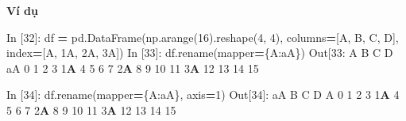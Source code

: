 \documentclass[
]{book}
\newenvironment{Shaded}{\begin{snugshade}}{\end{snugshade}}
\newcommand{\DecValTok}[1]{\textcolor[rgb]{0.00,0.00,0.81}{#1}}
\newcommand{\ErrorTok}[1]{\textcolor[rgb]{0.64,0.00,0.00}{\textbf{#1}}}
\newcommand{\NormalTok}[1]{#1}
\newcommand{\OperatorTok}[1]{\textcolor[rgb]{0.81,0.36,0.00}{\textbf{#1}}}
\newcommand{\StringTok}[1]{\textcolor[rgb]{0.31,0.60,0.02}{#1}}
\begin{document}
\textbf{Ví dụ}

\begin{Shaded}
\begin{Highlighting}[]
\NormalTok{In [}\DecValTok{32}\NormalTok{]: df }\OperatorTok{=}\NormalTok{ pd.DataFrame(np.arange(}\DecValTok{16}\NormalTok{).reshape(}\DecValTok{4}\NormalTok{, }\DecValTok{4}\NormalTok{),}
\NormalTok{                        columns}\OperatorTok{=}\NormalTok{[}\StringTok{\textquotesingle{}A\textquotesingle{}}\NormalTok{, }\StringTok{\textquotesingle{}B\textquotesingle{}}\NormalTok{, }\StringTok{\textquotesingle{}C\textquotesingle{}}\NormalTok{, }\StringTok{\textquotesingle{}D\textquotesingle{}}\NormalTok{],}
\NormalTok{                        index}\OperatorTok{=}\NormalTok{[}\StringTok{\textquotesingle{}A\textquotesingle{}}\NormalTok{, }\StringTok{\textquotesingle{}1A\textquotesingle{}}\NormalTok{, }\StringTok{\textquotesingle{}2A\textquotesingle{}}\NormalTok{, }\StringTok{\textquotesingle{}3A\textquotesingle{}}\NormalTok{])}
\NormalTok{In [}\DecValTok{33}\NormalTok{]: df.rename(mapper}\OperatorTok{=}\NormalTok{\{}\StringTok{\textquotesingle{}A\textquotesingle{}}\NormalTok{:}\StringTok{\textquotesingle{}aA\textquotesingle{}}\NormalTok{\})}
\NormalTok{Out[}\DecValTok{33}\NormalTok{: }
\NormalTok{     A   B   C   D}
\NormalTok{aA   }\DecValTok{0}   \DecValTok{1}   \DecValTok{2}   \DecValTok{3}
\DecValTok{1}\ErrorTok{A}   \DecValTok{4}   \DecValTok{5}   \DecValTok{6}   \DecValTok{7}
\DecValTok{2}\ErrorTok{A}   \DecValTok{8}   \DecValTok{9}  \DecValTok{10}  \DecValTok{11}
\DecValTok{3}\ErrorTok{A}  \DecValTok{12}  \DecValTok{13}  \DecValTok{14}  \DecValTok{15}

\NormalTok{In [}\DecValTok{34}\NormalTok{]: df.rename(mapper}\OperatorTok{=}\NormalTok{\{}\StringTok{\textquotesingle{}A\textquotesingle{}}\NormalTok{:}\StringTok{\textquotesingle{}aA\textquotesingle{}}\NormalTok{\}, axis}\OperatorTok{=}\DecValTok{1}\NormalTok{)}
\NormalTok{Out[}\DecValTok{34}\NormalTok{]:}
\NormalTok{    aA   B   C   D}
\NormalTok{A    }\DecValTok{0}   \DecValTok{1}   \DecValTok{2}   \DecValTok{3}
\DecValTok{1}\ErrorTok{A}   \DecValTok{4}   \DecValTok{5}   \DecValTok{6}   \DecValTok{7}
\DecValTok{2}\ErrorTok{A}   \DecValTok{8}   \DecValTok{9}  \DecValTok{10}  \DecValTok{11}
\DecValTok{3}\ErrorTok{A}  \DecValTok{12}  \DecValTok{13}  \DecValTok{14}  \DecValTok{15}


\end{Highlighting}
\end{Shaded}
\end{document}
